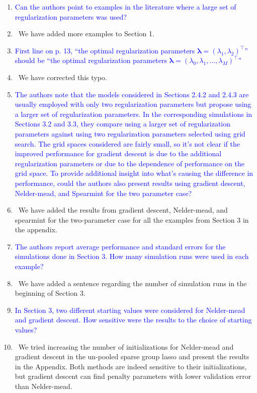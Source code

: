\documentclass[]{article}
\newcommand{\point}[1]{\item \textcolor{blue}{#1}}
\newcommand{\reply}{\item[]\ }
\begin{document}
	\begin{enumerate}
		\point{Can the authors point to examples in the literature where a large set of regularization parameters was used?}
		
		\reply We have added more examples to Section 1.
		
		\point{First line on p. 13, ``the optimal regularization parameters $\boldsymbol{\lambda} = (\lambda_1,\lambda_2)^\top$'' should be ``the optimal regularization parameters $\boldsymbol{\lambda} = (\lambda_0, \lambda_1, ... , \lambda_M)^\top$''}
		
		\reply We have corrected this typo.
		
		\point{The authors note that the models considered in Sections 2.4.2 and 2.4.3 are usually employed with only two regularization parameters but propose using a larger set of regularization parameters. In the corresponding simulations in Sections 3.2 and 3.3, they compare using a larger set of regularization parameters against using two regularization parameters selected using grid search. The grid spaces considered are fairly small, so it’s not clear if the improved performance for gradient descent is due to the additional regularization parameters or due to the dependence of performance on the grid space. To provide additional insight into what’s causing the difference in performance, could the authors also present results using gradient descent, Nelder-mead, and Spearmint for the two parameter case?}
		
		\reply We have added the results from gradient descent, Nelder-mead, and spearmint for the two-parameter case for all the examples from Section 3 in the appendix.
		
		\point{The authors report average performance and standard errors for the simulations done in Section 3. How many simulation runs were used in each example?}
		
		\reply We have added a sentence regarding the number of simulation runs in the beginning of Section 3.
		
		\point{In Section 3, two different starting values were considered for Nelder-mead and gradient descent. How sensitive were the results to the choice of starting values?}
		
		\reply We tried increasing the number of initializations for Nelder-mead and gradient descent in the un-pooled sparse group lasso and present the results in the Appendix. Both methods are indeed sensitive to their initializations, but gradient descent can find penalty parameters with lower validation error than Nelder-mead.
		

\end{enumerate}
\end{document}
